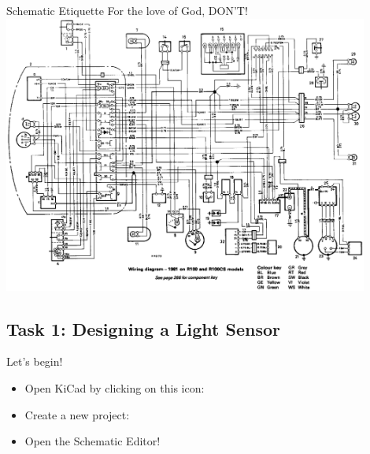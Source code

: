 \documentclass{beamer}
\begin{document}
\begin{frame}{Schematic Etiquette}
  For the love of God, DON'T!\\
  \centering
  \includegraphics[width=0.9\textwidth]{images/bad-schematic.png}
\end{frame}

\subsection{Task 1: Designing a Light Sensor}

\begin{frame}{Let's begin!}
  \begin{itemize}
    \item Open KiCad by clicking on this icon: 
    \item Create a new project: 
    \item Open the Schematic Editor!
  \end{itemize}
\end{frame}
\end{document}

